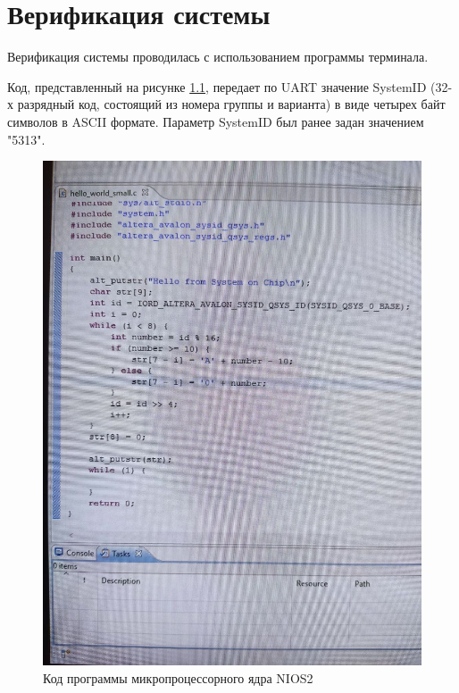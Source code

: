 \chapter{Верификация системы}

Верификация системы проводилась с использованием программы терминала.

Код, представленный на рисунке \ref{img:code},  передает по UART значение SystemID (32-х разрядный код, состоящий из номера группы и варианта) в виде четырех байт символов в ASCII формате. Параметр SystemID был ранее задан значением "5313".

\begin{figure}[H]
	\begin{center}
		\includegraphics[scale=0.3]{img/code.jpg}
	\end{center}
	\captionsetup{justification=centering}
	\caption{Код программы микропроцессорного ядра NIOS2}
	\label{img:code}
\end{figure}

